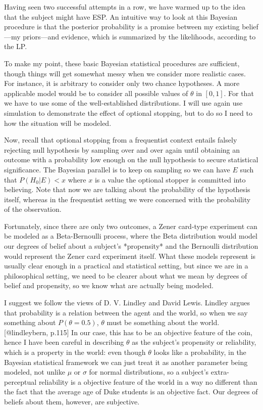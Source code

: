 Having seen two successful attempts in a row, we have warmed up to the
idea that the subject might have ESP. An intuitive way to look at this
Bayesian procedure is that the posterior probability is a promise
between my existing belief---my priors---and evidence, which is
summarized by the likelihoods, according to the LP.

To make my point, these basic Bayesian statistical procedures are
sufficient, though things will get somewhat messy when we consider more
realistic cases. For instance, it is arbitrary to consider only two
chance hypotheses. A more applicable model would be to consider all
possible values of \(\theta\) in \([0,1]\). For that we have to use some
of the well-established distributions. I will use again use simulation
to demonstrate the effect of optional stopping, but to do so I need to
how the situation will be modeled.

Now, recall that optional stopping from a frequentist context entails
falsely rejecting null hypothesis by sampling over and over again until
obtaining an outcome with a probability low enough on the null
hypothesis to secure statistical significance. The Bayesian parallel is
to keep on sampling so we can have \(E\) such that \(P(H_0|E) < x\)
where \(x\) is a value the optional stopper is committed into believing.
Note that now we are talking about the probability of the hypothesis
itself, whereas in the frequentist setting we were concerned with the
probability of the observation.

Fortunately, since there are only two outcomes, a Zener card-type
experiment can be modeled as a Beta-Bernoulli process, where the Beta
distribution would model our degrees of belief about a subject's
*propensity* and the Bernoulli distribution would represent the Zener
card experiment itself. What these models represent is usually clear
enough in a practical and statistical setting, but since we are in a
philosophical setting, we need to be clearer about what we mean by
degrees of belief and propensity, so we know what are actually being
modeled.

I suggest we follow the views of D. V. Lindley and David Lewis. Lindley
argues that probability is a relation between the agent and the world,
so when we say something about \(P(\theta=0.5)\), \(\theta\) must be
something about the world.{[}@lindleybern, p.115{]} In our case, this
has to be an objective feature of the coin, hence I have been careful in
describing \(\theta\) as the subject's propensity or reliability, which
is a property in the world: even though \(\theta\) looks like a
probability, in the Bayesian statistical framework we can just treat it
as another parameter being modeled, not unlike \(\mu\) or \(\sigma\) for
normal distributions, so a subject's extra-perceptual reliability is a
objective feature of the world in a way no different than the fact that
the average age of Duke students is an objective fact. Our degrees of
beliefs about them, however, are subjective.

